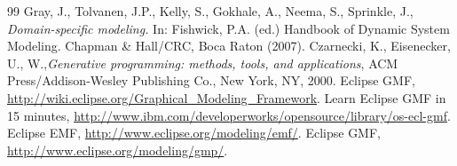 \documentclass[preprint, prX]{revtex4}
\begin{document}
\begin {thebibliography} {99}
 Gray, J., Tolvanen, J.P., Kelly, S., Gokhale, A., Neema, S., Sprinkle, J., \textit{Domain-specific modeling.} In: Fishwick, P.A. (ed.) Handbook of Dynamic System Modeling. Chapman \& Hall/CRC, Boca Raton (2007).
 Czarnecki, K., Eisenecker, U., W.,\textit{Generative programming: methods, tools, and applications}, ACM Press/Addison-Wesley Publishing Co., New York, NY, 2000.
Eclipse GMF, \url{http://wiki.eclipse.org/Graphical_Modeling_Framework}.
Learn Eclipse GMF in 15 minutes, \url{http://www.ibm.com/developerworks/opensource/library/os-ecl-gmf}.
Eclipse EMF, \url{http://www.eclipse.org/modeling/emf/}.
Eclipse GMF, \url{http://www.eclipse.org/modeling/gmp/}.

\end {thebibliography}

\end{document}
